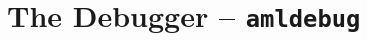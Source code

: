 
\chapter[The Debugger -- amldebug]{The Debugger -- \lstinline!amldebug!}
\label{ch:tools-amldebug}








